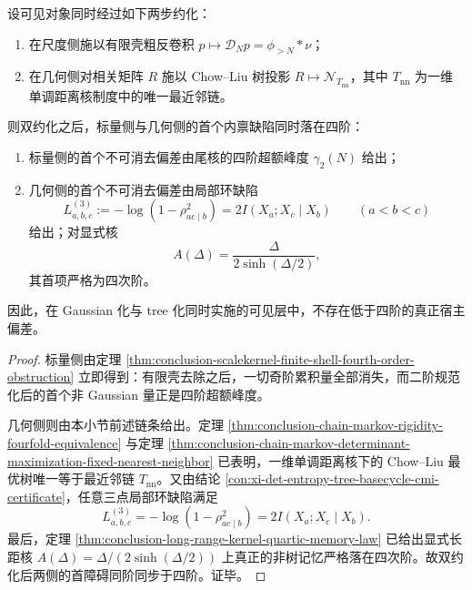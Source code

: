 \begin{theorem}[双约化可见层的四阶同步]\label{thm:conclusion-scalekernel-tree-fourth-order-synchronization}
设可见对象同时经过如下两步约化：
\begin{enumerate}
  \item 在尺度侧施以有限壳粗反卷积 \(p\mapsto \mathcal D_N p=\phi_{>N}*\nu\)；
  \item 在几何侧对相关矩阵 \(R\) 施以 Chow--Liu 树投影 \(R\mapsto \mathcal N_{T_{\mathrm{nn}}}\)，其中 \(T_{\mathrm{nn}}\) 为一维单调距离核制度中的唯一最近邻链。
\end{enumerate}
则双约化之后，标量侧与几何侧的首个内禀缺陷同时落在四阶：
\begin{enumerate}
  \item 标量侧的首个不可消去偏差由尾核的四阶超额峰度 \(\gamma_2(N)\) 给出；
  \item 几何侧的首个不可消去偏差由局部环缺陷
  \[
  L^{(3)}_{a,b,c}
  :=
  -\log(1-\rho_{ac\mid b}^2)
  =
  2I(X_a;X_c\mid X_b)
  \qquad (a<b<c)
  \]
  给出；对显式核
  \[
  A(\Delta)=\frac{\Delta}{2\sinh(\Delta/2)},
  \]
  其首项严格为四次阶。
\end{enumerate}
因此，在 Gaussian 化与 tree 化同时实施的可见层中，不存在低于四阶的真正宿主偏差。
\end{theorem}
\begin{proof}
标量侧由定理 \ref{thm:conclusion-scalekernel-finite-shell-fourth-order-obstruction} 立即得到：有限壳去除之后，一切奇阶累积量全部消失，而二阶规范化后的首个非 Gaussian 量正是四阶超额峰度。

几何侧则由本小节前述链条给出。定理 \ref{thm:conclusion-chain-markov-rigidity-fourfold-equivalence} 与定理 \ref{thm:conclusion-chain-markov-determinant-maximization-fixed-nearest-neighbor} 已表明，一维单调距离核下的 Chow--Liu 最优树唯一等于最近邻链 \(T_{\mathrm{nn}}\)。又由结论 \ref{con:xi-det-entropy-tree-basecycle-cmi-certificate}，任意三点局部环缺陷满足
\[
L^{(3)}_{a,b,c}
=
-\log(1-\rho_{ac\mid b}^2)
=
2I(X_a;X_c\mid X_b).
\]
最后，定理 \ref{thm:conclusion-long-range-kernel-quartic-memory-law} 已给出显式长距核 \(A(\Delta)=\Delta/(2\sinh(\Delta/2))\) 上真正的非树记忆严格落在四次阶。故双约化后两侧的首障碍同阶同步于四阶。证毕。
\end{proof}

